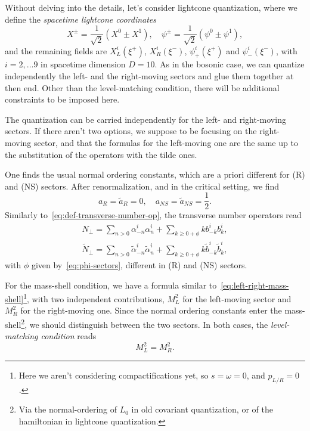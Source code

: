 Without delving into the details, let's consider lightcone quantization, where we define the \emph{spacetime lightcone coordinates}
\begin{equation}
    X^\pm = \frac{1}{\sqrt{2}} (X^0 \pm X^1), \quad \psi^\pm = \frac{1}{\sqrt{2}} (\psi^0 \pm \psi^1),
\end{equation}
and the remaining fields are $X^i_L(\xi^+)$, $X^i_R(\xi^-)$, $\psi^i_+(\xi^+)$ and $\psi^i_-(\xi^-)$, with $i = 2, \dots 9$ in spacetime dimension $D = 10$. As in the bosonic case, we can quantize independently the left- and the right-moving sectors and glue them together at then end. Other than the level-matching condition, there will be additional constraints to be imposed here.

The quantization can be carried independently for the left- and right-moving sectors. If there aren't two options, we suppose to be focusing on the right-moving sector, and that the formulas for the left-moving one are the same up to the substitution of the operators with the tilde ones.

One finds the usual normal ordering constants, which are a priori different for (R) and (NS) sectors. After renormalization, and in the critical setting, we find
\begin{equation}
    a_R = \tilde{a}_R = 0, \quad a_{NS} = \tilde{a}_{NS} = \frac{1}{2} .
\end{equation}
Similarly to~\eqref{eq:def-transverse-number-op}, the transverse number operators read
\begin{equation}\label{eq:superstring-transverse-number-op}
\begin{aligned}
    N_\perp = \sum_{n > 0} \alpha_{-n}^i \alpha^i_n + \sum_{k \geq 0 + \phi} k b^i_{-k} b^i_k , \\
    \tilde{N}_\perp = \sum_{n > 0} \tilde{\alpha}_{-n}^i \tilde{\alpha}^i_n + \sum_{k \geq 0 + \phi} k \tilde{b}^i_{-k} \tilde{b}^i_k ,
\end{aligned}
\end{equation}
with $\phi$ given by~\eqref{eq:phi-sectors}, different in (R) and (NS) sectors.


For the mass-shell condition, we have a formula similar to~\eqref{eq:left-right-mass-shell}\footnote{Here we aren't considering compactifications yet, so $s = \omega = 0$, and $p_{L/R} = 0$.}, with two independent contributions, $M^2_L$ for the left-moving sector and $M^2_R$ for the right-moving one. Since the normal ordering constants enter the mass-shell\footnote{Via the normal-ordering of $L_0$ in old covariant quantization, or of the hamiltonian in lightcone quantization.}, we should distinguish between the two sectors. In both cases, the \emph{level-matching condition} reads
\begin{equation}
    M^2_L = M^2_R.
\end{equation}

